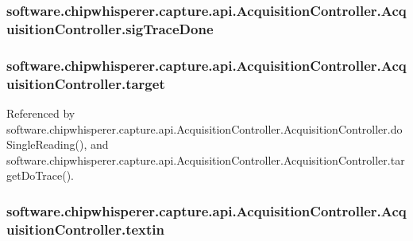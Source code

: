 \subsubsection[{sig\+Trace\+Done}]{\setlength{\rightskip}{0pt plus 5cm}software.\+chipwhisperer.\+capture.\+api.\+Acquisition\+Controller.\+Acquisition\+Controller.\+sig\+Trace\+Done}\label{classsoftware_1_1chipwhisperer_1_1capture_1_1api_1_1AcquisitionController_1_1AcquisitionController_a1722a723e1fc11c6f19c43a4a4e9e6f0}
\hypertarget{classsoftware_1_1chipwhisperer_1_1capture_1_1api_1_1AcquisitionController_1_1AcquisitionController_a8502324fb2e00cbc7e29b61b7d6cf0d8}{}
\subsubsection[{target}]{\setlength{\rightskip}{0pt plus 5cm}software.\+chipwhisperer.\+capture.\+api.\+Acquisition\+Controller.\+Acquisition\+Controller.\+target}\label{classsoftware_1_1chipwhisperer_1_1capture_1_1api_1_1AcquisitionController_1_1AcquisitionController_a8502324fb2e00cbc7e29b61b7d6cf0d8}


Referenced by software.\+chipwhisperer.\+capture.\+api.\+Acquisition\+Controller.\+Acquisition\+Controller.\+do\+Single\+Reading(), and software.\+chipwhisperer.\+capture.\+api.\+Acquisition\+Controller.\+Acquisition\+Controller.\+target\+Do\+Trace().

\hypertarget{classsoftware_1_1chipwhisperer_1_1capture_1_1api_1_1AcquisitionController_1_1AcquisitionController_a8c282ad809165ceff302ca92b733f657}{}
\subsubsection[{textin}]{\setlength{\rightskip}{0pt plus 5cm}software.\+chipwhisperer.\+capture.\+api.\+Acquisition\+Controller.\+Acquisition\+Controller.\+textin}\label{classsoftware_1_1chipwhisperer_1_1capture_1_1api_1_1AcquisitionController_1_1AcquisitionController_a8c282ad809165ceff302ca92b733f657}


